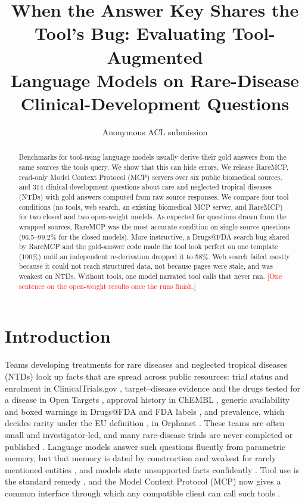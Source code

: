 \documentclass[11pt]{article}
\title{When the Answer Key Shares the Tool's Bug: Evaluating Tool-Augmented\\Language Models on Rare-Disease Clinical-Development Questions}
\author{Anonymous ACL submission}
\newcommand{\todo}[1]{\textcolor{red}{[#1]}}
\begin{document}
\maketitle

\begin{abstract}
Benchmarks for tool-using language models usually derive their gold answers from the same sources the tools query. We show that this can hide errors. We release RareMCP, read-only Model Context Protocol (MCP) servers over six public biomedical sources, and 314 clinical-development questions about rare and neglected tropical diseases (NTDs) with gold answers computed from raw source responses. We compare four tool conditions (no tools, web search, an existing biomedical MCP server, and RareMCP) for two closed and two open-weight models. As expected for questions drawn from the wrapped sources, RareMCP was the most accurate condition on single-source questions (96.5--99.2\% for the closed models). More instructive, a Drugs@FDA search bug shared by RareMCP and the gold-answer code made the tool look perfect on one template (100\%) until an independent re-derivation dropped it to 58\%. Web search failed mostly because it could not reach structured data, not because pages were stale, and was weakest on NTDs. Without tools, one model narrated tool calls that never ran. \todo{One sentence on the open-weight results once the runs finish.}
\end{abstract}

\section{Introduction}

Teams developing treatments for rare diseases and neglected tropical diseases (NTDs) look up facts that are spread across public resources: trial status and enrolment in ClinicalTrials.gov \citep{ctgov}, target--disease evidence and the drugs tested for a disease in Open Targets \citep{opentargets}, approval history in ChEMBL \citep{chembl}, generic availability and boxed warnings in Drugs@FDA and FDA labels \citep{openfda}, and prevalence, which decides rarity under the EU definition \citep{eurare}, in Orphanet \citep{orphadata}. These teams are often small and investigator-led, and many rare-disease trials are never completed or published \citep{rees2019}. Language models answer such questions fluently from parametric memory, but that memory is dated by construction and weakest for rarely mentioned entities \citep{kandpal2023}, and models state unsupported facts confidently \citep{ji2023}. Tool use is the standard remedy \citep{toolformer, genegpt}, and the Model Context Protocol (MCP) now gives a common interface through which any compatible client can call such tools \citep{mcp}.
\end{document}
